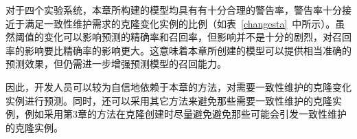 对于四个实验系统，本章所构建的模型均具有有十分合理的警告率，警告率十分接近于满足一致性维护需求的克隆变化实例的比例（如表~\ref {changesta}~中所示）。虽然阈值的变化可以影响预测的精确率和召回率，但影响并不是十分的剧烈，对召回率的影响要比精确率的影响更大。这意味着本章所创建的模型可以提供相当准确的预测效果，但仍需进一步增强预测模型的召回能力。

因此，开发人员可以较为自信地依赖于本章的方法，对需要一致性维护的克隆变化实例进行预测。同时，还可以采用其它方法来避免那些需要一致性维护的克隆实例，例如采用第3章的方法在克隆创建时尽量避免避免那些可能会引发一致性维护的克隆实例。

